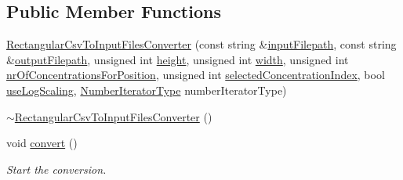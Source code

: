 \subsection*{\-Public \-Member \-Functions}
\begin{DoxyCompactItemize}
\item 
\hyperlink{classmultiscale_1_1video_1_1RectangularCsvToInputFilesConverter_a7c0f23d2937406a81a0ed04abf2ef9d3}{\-Rectangular\-Csv\-To\-Input\-Files\-Converter} (const string \&\hyperlink{classmultiscale_1_1video_1_1RectangularCsvToInputFilesConverter_a407e3c2607f036d531445e22454a910e}{input\-Filepath}, const string \&\hyperlink{classmultiscale_1_1video_1_1RectangularCsvToInputFilesConverter_a2bb6a802fac9b0928bc53a8c71a1c33c}{output\-Filepath}, unsigned int \hyperlink{classmultiscale_1_1video_1_1RectangularCsvToInputFilesConverter_a766bc7eea1c602f46a4a6c0948464c8a}{height}, unsigned int \hyperlink{classmultiscale_1_1video_1_1RectangularCsvToInputFilesConverter_a7fe7f3d014535567fbeb465eb01cde1b}{width}, unsigned int \hyperlink{classmultiscale_1_1video_1_1RectangularCsvToInputFilesConverter_a0bfea1eb0f7dc76deee05af1e2eb744b}{nr\-Of\-Concentrations\-For\-Position}, unsigned int \hyperlink{classmultiscale_1_1video_1_1RectangularCsvToInputFilesConverter_a5143d25a98a097107c2bed748b4d8df0}{selected\-Concentration\-Index}, bool \hyperlink{classmultiscale_1_1video_1_1RectangularCsvToInputFilesConverter_a7739ee04a9340d981896861904022f26}{use\-Log\-Scaling}, \hyperlink{namespacemultiscale_a6ef911f4d48a4bf5e657c237ec169ff5}{\-Number\-Iterator\-Type} number\-Iterator\-Type)
\item 
\hyperlink{classmultiscale_1_1video_1_1RectangularCsvToInputFilesConverter_ad45bb79ad6c37954376d4f9904872870}{$\sim$\-Rectangular\-Csv\-To\-Input\-Files\-Converter} ()
\item 
void \hyperlink{classmultiscale_1_1video_1_1RectangularCsvToInputFilesConverter_a5872c0ae1f39c52103ed3e62a388f80b}{convert} ()
\begin{DoxyCompactList}\small\item\em \-Start the conversion. \end{DoxyCompactList}\end{DoxyCompactItemize}
